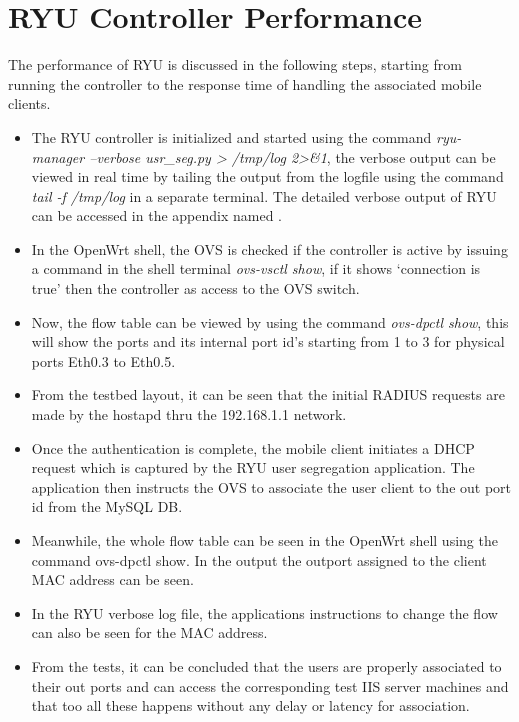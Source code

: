 \section{RYU Controller Performance}
The performance of RYU is discussed in the following steps, starting from running the controller to the response time of handling the associated mobile clients.
\begin{itemize}
	\item  The RYU controller is initialized and started using the command \textit{ryu-manager --verbose usr\_seg.py > /tmp/log 2>\&1}, the verbose output can be viewed in real time by tailing the output from the logfile using the command \textit{tail -f /tmp/log} in a separate terminal. The detailed verbose output of RYU can be accessed in the appendix named .
	\item In the OpenWrt shell, the OVS is checked if the controller is active by issuing a command in the shell terminal \textit{ovs-vsctl show}, if it shows ‘connection is true’ then the controller as access to the OVS switch.
	\item Now, the flow table can be viewed by using the command \textit{ovs-dpctl show}, this will show the ports and its internal port id’s starting from 1 to 3 for physical ports Eth0.3 to Eth0.5.
	\item From the testbed layout, it can be seen that the initial RADIUS requests are made by the hostapd thru the 192.168.1.1 network. 
	\item Once the authentication is complete, the mobile client initiates a DHCP request which is captured by the RYU user segregation application. The application then instructs the OVS to associate the user client to the out port id from the MySQL DB. 
	\item Meanwhile, the whole flow table can be seen in the OpenWrt shell using the command ovs-dpctl show. In the output the outport assigned to the client MAC address can be seen.
	\item In the RYU verbose log file, the applications instructions to change the flow can also be seen for the MAC address.
	\item From the tests, it can be concluded that the users are properly associated to their out ports and can access the corresponding test IIS server machines and that too all these happens without any delay or latency for association.
	
\end{itemize}
